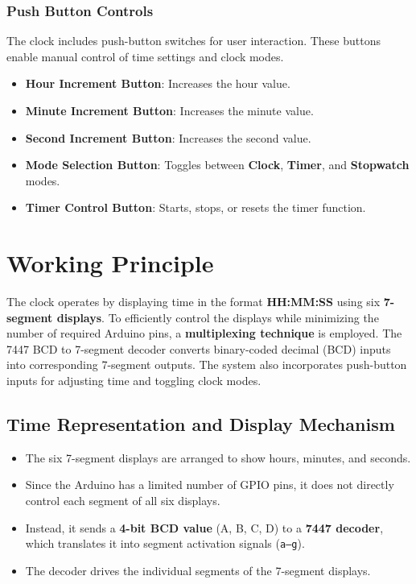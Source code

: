 \documentclass[journal]{IEEEtran}
\begin{document}
\subsubsection{Push Button Controls}
The clock includes push-button switches for user interaction. These buttons enable manual control of time settings and clock modes.

\begin{itemize}
    \item \textbf{Hour Increment Button}: Increases the hour value.
    \item \textbf{Minute Increment Button}: Increases the minute value.
    \item \textbf{Second Increment Button}: Increases the second value.
    \item \textbf{Mode Selection Button}: Toggles between \textbf{Clock}, \textbf{Timer}, and \textbf{Stopwatch} modes.
    \item \textbf{Timer Control Button}: Starts, stops, or resets the timer function.
\end{itemize}

\section{Working Principle}

The clock operates by displaying time in the format \textbf{HH:MM:SS} using six \textbf{7-segment displays}. To efficiently control the displays while minimizing the number of required Arduino pins, a \textbf{multiplexing technique} is employed. The 7447 BCD to 7-segment decoder converts binary-coded decimal (BCD) inputs into corresponding 7-segment outputs. The system also incorporates push-button inputs for adjusting time and toggling clock modes.

\subsection{Time Representation and Display Mechanism}

\begin{itemize}
    \item The six 7-segment displays are arranged to show hours, minutes, and seconds.
    \item Since the Arduino has a limited number of GPIO pins, it does not directly control each segment of all six displays.
    \item Instead, it sends a \textbf{4-bit BCD value} (A, B, C, D) to a \textbf{7447 decoder}, which translates it into segment activation signals (\texttt{a--g}).
    \item The decoder drives the individual segments of the 7-segment displays.
\end{itemize}
\end{document}
